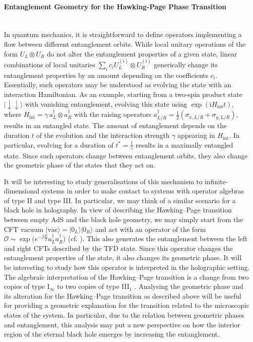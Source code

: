 \documentclass[a4paper,11pt]{article}
\renewcommand{\i}{\text{i}}
\newcommand{\1}{\mathds{1}}
\begin{document}
\paragraph{Entanglement Geometry for the Hawking-Page Phase Transition}~\\
In quantum mechanics, it is straightforward to define
operators implementing a flow between different entanglement orbits. While local unitary operations of the form $U_L\otimes U_R$ do not alter the entanglement properties of a given state, linear combinations of local unitaries $\sum_ic_iU_L^{(i)}\otimes U_R^{(i)}$ generically change its entanglement properties by an amount depending on the coefficients $c_i$. Essentially, such operators may be understood as evolving the state with an interaction Hamiltonian. As an example, starting from a two-spin product state $|\!\downarrow\downarrow\rangle$ with vanishing entanglement, evolving this state using $\exp(\i H_{\text{int}}t)$, where $H_{\text{int}}=\gamma\,a_L^\dagger\otimes a_R^\dagger$ with the raising operators $a_{L/R}^\dagger=\frac{1}{2}(\sigma_{x,L/R}+\sigma_{y,L/R})$, results in an entangled state. The amount of entanglement depends on the duration $t$ of the evolution and the interaction strength $\gamma$ appearing in $H_{\text{int}}$. In particular, evolving for a duration of $t^\ast=\frac{1}{\gamma}$ results in a maximally entangled state. Since such operators change between entanglement orbits, they also change the geometric phase of the states that they act on. 

It will be interesting to study generalisations of this mechanism to infinite-dimensional systems in order to make contact to systems with operator algebras of type II and type III. In particular, we may think of a similar scenario for a black hole in holography. 
In view of describing the Hawking--Page transition \cite{Hawking:1982dh}
between empty AdS and the black hole geometry, we may 
simply start from  the CFT vacuum $|\text{vac}\rangle=|0_L\rangle|0_R\rangle$ and act with an operator of the form $\mathcal{O}\sim\exp\!\big(e^{-\beta\frac{E}{2}}a_L^\dagger a_R^\dagger)$  (cf. \cite{Israel:1976ur}). This also generates the entanglement between the left and right CFTs described by the TFD state. Since this operator changes the entanglement properties of the state, it also changes its geometric phase. It will be interesting to study how this operator is interpreted in the holographic setting.  The algebraic interpretation of the Hawking--Page transition is a change from two copies of type I$_\infty$ to two copies of type III$_1$ \cite{Leutheusser:2021frk,Leutheusser:2021qhd}. Analysing the geometric phase and its alteration for the Hawking--Page transition as described above will be useful for providing a geometric explanation for the transition related to the microscopic states of the system. In particular, due to the relation between geometric phases and entanglement, this analysis may put a new perspective on how the interior region of the eternal black hole emerges by increasing the entanglement.
\end{document}
